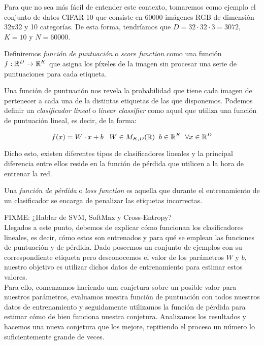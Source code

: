 Para que no sea más fácil de entender este contexto, tomaremos como ejemplo el conjunto de datos CIFAR-10 que consiste en 60000 imágenes RGB de dimensión 32x32 y 10 categorías. De esta forma, tendríamos que $D=32\cdot 32 \cdot 3 = 3072$, $K=10$ y $N=60000$.

\begin{definicion}\label{def:ScoreFunction}
Definiremos \emph{función de puntuación} o \emph{score function} como una función $f:\mathbb{R}^D \to \mathbb{R}^K$ que asigna los píxeles de la imagen sin procesar una serie de puntuaciones para cada etiqueta.
\end{definicion}

Una función de puntuación nos revela la probabilidad que tiene cada imagen de pertenecer a cada una de la distintas etiquetas de las que disponemos. Podemos definir un \emph{clasificador lineal} o \emph{linear classifier} \label{def:LinearClassifier} como aquel que utiliza una función de puntuación lineal, es decir, de la forma:

$$f(x)=W\cdot x+ b\; \; \; W\in M_{K,D}(\mathbb{R}) \;\; b \in \mathbb{R}^K \;\; \forall x\in \mathbb{R}^D$$

Dicho esto, existen diferentes tipos de clasificadores lineales y la principal diferencia entre ellos reside en la función de pérdida que utilicen a la hora de entrenar la red.

\begin{definicion}\label{def:LossFunction}
Una \emph{función de pérdida} o \emph{loss function} es aquella que durante el entrenamiento de un clasificador se encarga de penalizar las etiquetas incorrectas.
\end{definicion}

FIXME: ¿Hablar de SVM, SoftMax y Cross-Entropy?\\

Llegados a este punto, debemos de explicar cómo funcionan los clasificadores lineales, es decir, cómo estos son entrenados y para qué se emplean las funciones de puntuación y de pérdida. Dado poseemos un conjunto de ejemplos con su correspondiente etiqueta pero desconocemos el valor de los parámetros $W$ y $b$, nuestro objetivo es utilizar dichos datos de entrenamiento para estimar estos valores. \\

Para ello, comenzamos haciendo una conjetura sobre un posible valor para nuestros parámetros, evaluamos nuestra función de puntuación con todos nuestros datos de entrenamiento y seguidamente utilizamos la función de pérdida para estimar cómo de bien funciona nuestra conjetura. Analizamos los resultados y hacemos una nueva conjetura que los mejore, repitiendo el proceso un número lo suficientemente grande de veces.\\

